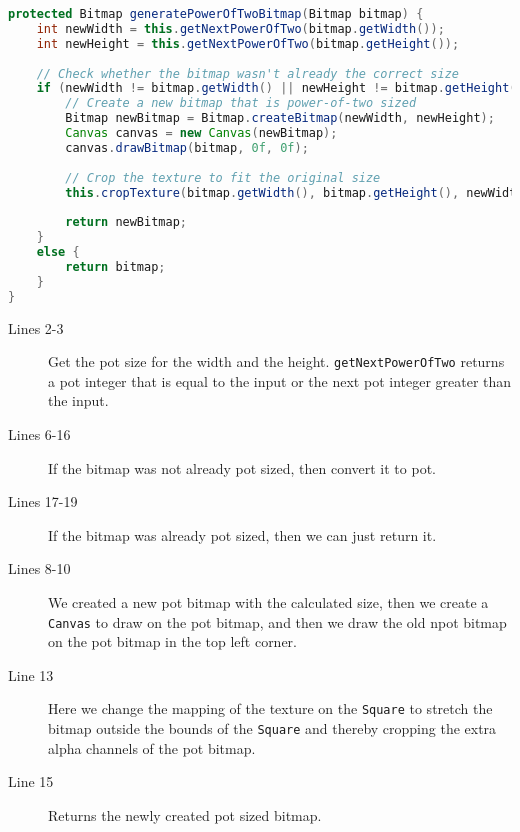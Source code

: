 \begin{lstlisting}[language=java,caption={How we generate \ac{pot} sized texture.},label=lst:pot] 
protected Bitmap generatePowerOfTwoBitmap(Bitmap bitmap) {
    int newWidth = this.getNextPowerOfTwo(bitmap.getWidth());
    int newHeight = this.getNextPowerOfTwo(bitmap.getHeight());
    
    // Check whether the bitmap wasn't already the correct size
    if (newWidth != bitmap.getWidth() || newHeight != bitmap.getHeight()) {
        // Create a new bitmap that is power-of-two sized
        Bitmap newBitmap = Bitmap.createBitmap(newWidth, newHeight);
        Canvas canvas = new Canvas(newBitmap);
        canvas.drawBitmap(bitmap, 0f, 0f);
        
        // Crop the texture to fit the original size
        this.cropTexture(bitmap.getWidth(), bitmap.getHeight(), newWidth, newHeight);
        
        return newBitmap;
    }
    else {
        return bitmap;
    }
}
\end{lstlisting}

\begin{description}
\item[Lines 2-3] Get the \ac{pot} size for the width and the height. \lstinline|getNextPowerOfTwo| returns a \ac{pot} integer that is equal to the input or the next \ac{pot} integer greater than the input.
\item[Lines 6-16] If the bitmap was not already \ac{pot} sized, then convert it to \ac{pot}.
\item[Lines 17-19] If the bitmap was already \ac{pot} sized, then we can just return it.
\item[Lines 8-10] We created a new \ac{pot} bitmap with the calculated size, then we create a \lstinline|Canvas| to draw on the \ac{pot} bitmap, and then we draw the old \ac{npot} bitmap on the \ac{pot} bitmap in the top left corner.
\item[Line 13] Here we change the mapping of the texture on the \lstinline|Square| to stretch the bitmap outside the bounds of the \lstinline|Square| and thereby cropping the extra alpha channels of the \ac{pot} bitmap.
\item[Line 15] Returns the newly created \ac{pot} sized bitmap.
\end{description}

